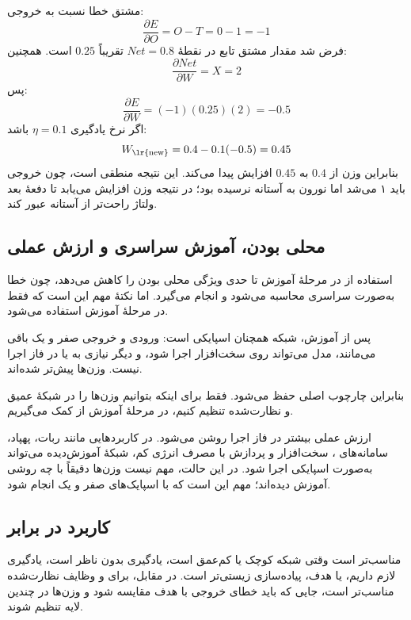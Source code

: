 مشتق خطا نسبت به خروجی:
\[
\frac{\partial E}{\partial O} = O - T = 0 - 1 = -1
\]
فرض شد مقدار مشتق تابع  در نقطهٔ \(Net=0.8\) تقریباً \(0.25\) است. همچنین:
\[
\frac{\partial Net}{\partial W} = X = 2
\]
پس:
\[
\frac{\partial E}{\partial W}
=
(-1)(0.25)(2)
=
-0.5
\]
اگر نرخ یادگیری \(\eta = 0.1\) باشد:
\[
W_{\text{\lr{new}}}
=
0.4 - 0.1(-0.5)
=
0.45
\]
بنابراین وزن از \(0.4\) به \(0.45\) افزایش پیدا می‌کند. این نتیجه منطقی است، چون خروجی باید ۱ می‌شد اما نورون به آستانه نرسیده بود؛ در نتیجه وزن افزایش می‌یابد تا دفعهٔ بعد ولتاژ راحت‌تر از آستانه عبور کند.

\subsection{محلی بودن، آموزش سراسری و ارزش عملی }
استفاده از  در مرحلهٔ آموزش تا حدی ویژگی محلی بودن  را کاهش می‌دهد، چون خطا به‌صورت سراسری محاسبه می‌شود و  انجام می‌گیرد. اما نکتهٔ مهم این است که  فقط در مرحلهٔ آموزش استفاده می‌شود.

پس از آموزش، شبکه همچنان اسپایکی است: ورودی و خروجی صفر و یک باقی می‌مانند، مدل می‌تواند روی سخت‌افزار  اجرا شود، و دیگر نیازی به  یا  در فاز اجرا نیست. وزن‌ها پیش‌تر  شده‌اند.

بنابراین چارچوب اصلی  حفظ می‌شود. فقط برای اینکه بتوانیم وزن‌ها را در شبکهٔ عمیق و نظارت‌شده تنظیم کنیم، در مرحلهٔ آموزش از  کمک می‌گیریم.

ارزش عملی  بیشتر در فاز اجرا روشن می‌شود. در کاربردهایی مانند ربات، پهپاد، سامانه‌های ، سخت‌افزار  و پردازش  با مصرف انرژی کم، شبکهٔ آموزش‌دیده می‌تواند به‌صورت اسپایکی اجرا شود. در این حالت، مهم نیست وزن‌ها دقیقاً با چه روشی آموزش دیده‌اند؛ مهم این است که  با اسپایک‌های صفر و یک انجام شود.

\subsection{کاربرد  در برابر }
 مناسب‌تر است وقتی شبکه کوچک یا کم‌عمق است، یادگیری بدون ناظر است، یادگیری  لازم داریم، یا هدف، پیاده‌سازی زیستی‌تر است. در مقابل،  برای  و وظایف نظارت‌شده مناسب‌تر است، جایی که باید خطای خروجی با هدف مقایسه شود و وزن‌ها در چندین لایه تنظیم شوند.
